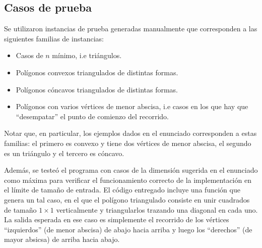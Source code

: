 \newpage

\subsection{Casos de prueba}

Se utilizaron instancias de prueba generadas manualmente que corresponden a las siguientes familias de instancias:

\begin{itemize}
\setlength\itemsep{0em}

\item Casos de $n$ mínimo, i.e triángulos.
\item Polígonos convexos triangulados de distintas formas.
\item Polígonos cóncavos triangulados de distintas formas.
\item Polígonos con varios vértices de menor abscisa, i.e casos en los que hay que ``desempatar'' el punto de comienzo del recorrido.

\end{itemize}

Notar que, en particular, los ejemplos dados en el enunciado corresponden a estas familias: el primero es convexo y tiene dos vértices de menor abscisa, el segundo es un triángulo y el tercero es cóncavo.

\medskip

Además, se testeó el programa con casos de la dimensión sugerida en el enunciado como máxima para verificar el funcionamiento correcto de la implementación en el límite de tamaño de entrada. El código entregado incluye una función que genera un tal caso, en el que el polígono triangulado consiste en unir cuadrados de tamaño $1 \times 1$ verticalmente y triangularlos trazando una diagonal en cada uno. La salida esperada en ese caso es simplemente el recorrido de los vértices ``izquierdos'' (de menor abscisa) de abajo hacia arriba y luego los ``derechos'' (de mayor absicsa) de arriba hacia abajo.

